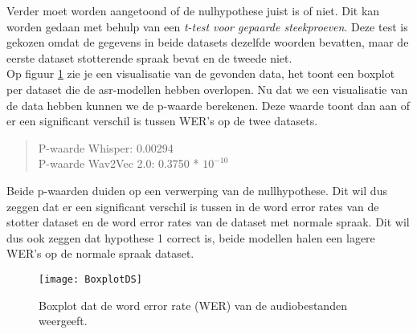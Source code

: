 Verder moet worden aangetoond of de nulhypothese juist is of niet. Dit kan worden gedaan met behulp van een \emph{t-test voor gepaarde steekproeven}. Deze test is gekozen omdat de gegevens in beide datasets dezelfde woorden bevatten, maar de eerste dataset stotterende spraak bevat en de tweede niet.\\

Op figuur \ref{fig:boxplot} zie je een visualisatie van de gevonden data, het toont een boxplot per dataset die de asr-modellen hebben overlopen. Nu dat we een visualisatie van de data hebben kunnen we de p-waarde berekenen. Deze waarde toont dan aan of er een significant verschil is tussen WER's op de twee datasets.
\begin{quote}
    P-waarde Whisper: 0.00294\\
    P-waarde Wav2Vec 2.0: 0.3750 * $10^{-10}$ 
\end{quote} 
Beide p-waarden duiden op een verwerping van de nullhypothese. Dit wil dus zeggen dat er een significant verschil is tussen in de word error rates van de stotter dataset en de word error rates van de dataset met normale spraak. Dit wil dus ook zeggen dat hypothese 1 correct is, beide modellen halen een lagere WER's op de normale spraak dataset.

\begin{figure}[H]
    \texttt{[image: BoxplotDS]}
    \caption{Boxplot dat de word error rate (WER) van de audiobestanden weergeeft.}
    \label{fig:boxplot}
\end{figure}

